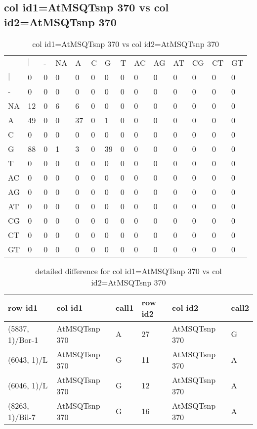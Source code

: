 \subsection{col id1=AtMSQTsnp 370 vs col id2=AtMSQTsnp 370}
\begin{center}
\begin{longtable}{|l|l|l|l|l|l|l|l|l|l|l|l|l|l|}
\caption{col id1=AtMSQTsnp 370 vs col id2=AtMSQTsnp 370} \label{table_dm686}\\
\hline
\\
\hline
&$|$&-&NA&A&C&G&T&AC&AG&AT&CG&CT&GT\\
$|$&0&0&0&0&0&0&0&0&0&0&0&0&0\\
-&0&0&0&0&0&0&0&0&0&0&0&0&0\\
NA&12&0&6&6&0&0&0&0&0&0&0&0&0\\
A&49&0&0&37&0&1&0&0&0&0&0&0&0\\
C&0&0&0&0&0&0&0&0&0&0&0&0&0\\
G&88&0&1&3&0&39&0&0&0&0&0&0&0\\
T&0&0&0&0&0&0&0&0&0&0&0&0&0\\
AC&0&0&0&0&0&0&0&0&0&0&0&0&0\\
AG&0&0&0&0&0&0&0&0&0&0&0&0&0\\
AT&0&0&0&0&0&0&0&0&0&0&0&0&0\\
CG&0&0&0&0&0&0&0&0&0&0&0&0&0\\
CT&0&0&0&0&0&0&0&0&0&0&0&0&0\\
GT&0&0&0&0&0&0&0&0&0&0&0&0&0\\
\hline
\end{longtable}
\end{center}

\begin{center}
\begin{longtable}{|l|l|l|l|l|l|}
\caption{detailed difference for col id1=AtMSQTsnp 370 vs col id2=AtMSQTsnp 370} \label{table_dm687}\\
\hline
row id1&col id1&call1&row id2&col id2&call2\\
\hline
(5837, 1)/Bor-1&AtMSQTsnp 370&A&27&AtMSQTsnp 370&G\\
(6043, 1)/L&AtMSQTsnp 370&G&11&AtMSQTsnp 370&A\\
(6046, 1)/L&AtMSQTsnp 370&G&12&AtMSQTsnp 370&A\\
(8263, 1)/Bil-7&AtMSQTsnp 370&G&16&AtMSQTsnp 370&A\\
\hline
\end{longtable}
\end{center}

